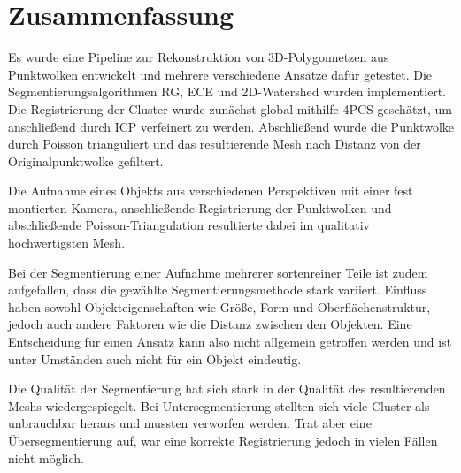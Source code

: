 
\chapter{Zusammenfassung}
\label{ch:zusammenfassung}

Es wurde eine Pipeline zur Rekonstruktion von 3D-Polygonnetzen aus Punktwolken entwickelt und mehrere verschiedene Ansätze dafür getestet.
Die Segmentierungsalgorithmen \ac{RG}, \ac{ECE} und 2D-Watershed wurden implementiert.
Die Registrierung der Cluster wurde zunächst global mithilfe \ac{4PCS} geschätzt, um anschließend durch \ac{ICP} verfeinert zu werden.
Abschließend wurde die Punktwolke durch Poisson trianguliert und das resultierende Mesh nach Distanz von der Originalpunktwolke gefiltert.

Die Aufnahme eines Objekts aus verschiedenen Perspektiven mit einer fest montierten Kamera, anschließende Registrierung der Punktwolken und abschließende Poisson-Triangulation resultierte dabei im qualitativ hochwertigsten Mesh.

Bei der Segmentierung einer Aufnahme mehrerer sortenreiner Teile ist zudem aufgefallen, dass die gewählte Segmentierungsmethode stark variiert.
Einfluss haben sowohl Objekteigenschaften wie Größe, Form und Oberflächenstruktur, jedoch auch andere Faktoren wie die Distanz zwischen den Objekten.
Eine Entscheidung für einen Ansatz kann also nicht allgemein getroffen werden und ist unter Umständen auch nicht für ein Objekt eindeutig.

Die Qualität der Segmentierung hat sich stark in der Qualität des resultierenden Meshs wiedergespiegelt.
Bei Untersegmentierung stellten sich viele Cluster als unbrauchbar heraus und mussten verworfen werden.
Trat aber eine Übersegmentierung auf, war eine korrekte Registrierung jedoch in vielen Fällen nicht möglich.

